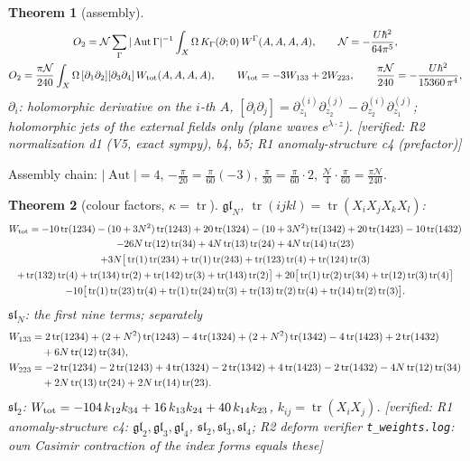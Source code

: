 \documentclass[10pt,a4paper]{article}
\numberwithin{equation}{section}
\newtheorem{theorem}{Theorem}[section]
\theoremstyle{definition}
\theoremstyle{remark}
\newcommand{\tr}{\operatorname{tr}}
\newcommand{\fsl}{\mathfrak{sl}}
\newcommand{\fgl}{\mathfrak{gl}}
\newcommand{\cN}{\mathcal N}
\newcommand{\Aut}{\operatorname{Aut}}
\newcommand{\ver}[1]{\textup{[verified: #1]}}
\begin{document}
\begin{theorem}[assembly]\label{thm-assembly}
\begin{gather}
O_2=\cN\sum_\Gamma|\Aut\Gamma|^{-1}\int_X\Omega\,K_\Gamma(\partial;0)\,W^\Gamma(A,A,A,A),\qquad \cN=-\frac{U\hbar^2}{64\pi^5},\\
O_2=\frac{\pi\cN}{240}\int_X\Omega\,[\partial_1\partial_2][\partial_3\partial_4]\,W_{\rm tot}(A,A,A,A),\qquad W_{\rm tot}=-3W_{133}+2W_{223},\qquad \frac{\pi\cN}{240}=-\frac{U\hbar^2}{15360\,\pi^4},
\end{gather}
$\partial_i$: holomorphic derivative on the $i$-th $A$, $[\partial_i\partial_j]=\partial^{(i)}_{z_1}\partial^{(j)}_{z_2}-\partial^{(i)}_{z_2}\partial^{(j)}_{z_1}$; holomorphic jets of the external fields only (plane waves $e^{\lambda\cdot z}$).
\ver{R2 normalization d1 (V5, exact sympy), b4, b5; R1 anomaly-structure c4 (prefactor)}
\end{theorem}
Assembly chain: $|\Aut|=4$, $-\frac\pi{20}=\frac{\pi}{60}(-3)$, $\frac\pi{30}=\frac\pi{60}\cdot2$, $\frac{\cN}4\cdot\frac\pi{60}=\frac{\pi\cN}{240}$.

\begin{theorem}[colour factors, $\kappa=\tr$]\label{thm-colour}
$\fgl_N$, $\tr(ijkl)=\tr(X_iX_jX_kX_l)$:
\begin{multline}
W_{\rm tot}=-10\tr(1234)-(10+3N^2)\tr(1243)+20\tr(1324)-(10+3N^2)\tr(1342)+20\tr(1423)-10\tr(1432)\\
-26N\tr(12)\tr(34)+4N\tr(13)\tr(24)+4N\tr(14)\tr(23)\\
+3N\big[\tr(1)\tr(234)+\tr(1)\tr(243)+\tr(123)\tr(4)+\tr(124)\tr(3)\\
+\tr(132)\tr(4)+\tr(134)\tr(2)+\tr(142)\tr(3)+\tr(143)\tr(2)\big]
+20\big[\tr(1)\tr(2)\tr(34)+\tr(12)\tr(3)\tr(4)\big]\\
-10\big[\tr(1)\tr(23)\tr(4)+\tr(1)\tr(24)\tr(3)+\tr(13)\tr(2)\tr(4)+\tr(14)\tr(2)\tr(3)\big].
\end{multline}
$\fsl_N$: the first nine terms; separately
\begin{align}
W_{133}&=2\tr(1234)+(2+N^2)\tr(1243)-4\tr(1324)+(2+N^2)\tr(1342)-4\tr(1423)+2\tr(1432)\notag\\&\quad+6N\tr(12)\tr(34),\\
W_{223}&=-2\tr(1234)-2\tr(1243)+4\tr(1324)-2\tr(1342)+4\tr(1423)-2\tr(1432)-4N\tr(12)\tr(34)\notag\\&\quad+2N\tr(13)\tr(24)+2N\tr(14)\tr(23).
\end{align}
$\fsl_2$: $W_{\rm tot}=-104\,k_{12}k_{34}+16\,k_{13}k_{24}+40\,k_{14}k_{23}$, $k_{ij}=\tr(X_iX_j)$.
\ver{R1 anomaly-structure c4: $\fgl_2,\fgl_3,\fgl_4$, $\fsl_2,\fsl_3,\fsl_4$; R2 deform verifier \texttt{t\_weights.log}: own Casimir contraction of the index forms equals these}
\end{theorem}
\end{document}
